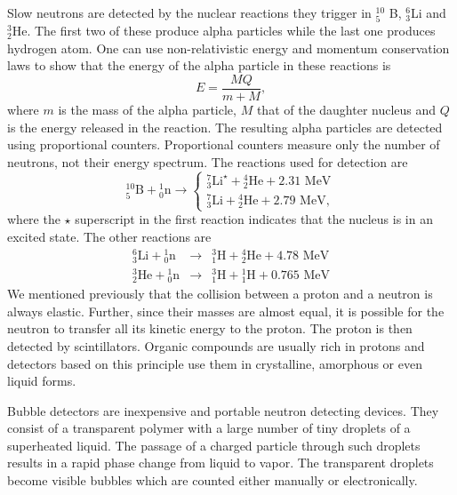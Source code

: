 \documentclass{article}
\numberwithin{equation}{section}
\begin{document}
Slow neutrons are detected by the nuclear reactions they trigger in ${}^{10}_5$
B, ${}^6_3$Li and ${}^3_2$He. The first two of these produce alpha particles
while the last one produces hydrogen atom. One can use non-relativistic energy
and momentum conservation laws to show that the energy of the alpha particle
in these reactions is \cite{turner2008atoms}
\begin{equation}\label{s5e1}
E = \frac{MQ}{m + M},
\end{equation}
where $m$ is the mass of the alpha particle, $M$ that of the daughter 
nucleus and $Q$ is the energy released in the reaction. The resulting alpha
particles are detected using proportional counters. Proportional counters
measure only the number of neutrons, not their energy spectrum. The reactions
used for detection are \cite{crane1991neutron}
\begin{equation}\label{s5e2}
{}^{10}_5\text{B}+{}^1_0\text{n} \rightarrow \begin{cases}
{}^7_3\text{Li}^\star + {}^4_2\text{He} + 2.31\text{ MeV} \\
{}^7_3\text{Li} + {}^4_2\text{He} + 2.79\text{ MeV}, 
\end{cases}
\end{equation}
where the $\star$ superscript in the first reaction indicates that the nucleus
is in an excited state. The other reactions are
\begin{eqnarray}
{}^6_3\text{Li}+{}^1_0\text{n}&\rightarrow&{}^3_1\text{H} + {}^4_2\text{He} +
4.78\text{ MeV} \label{s5e3} \\
{}^3_2\text{He}+{}^1_0\text{n}&\rightarrow&{}^3_1\text{H} + {}^1_1\text{H} +
0.765\text{ MeV} \label{s5e4} 
\end{eqnarray}
We mentioned previously that the collision between a proton and a neutron is
always elastic. Further, since their masses are almost equal, it is possible
for the neutron to transfer all its kinetic energy to the proton. The proton
is then detected by scintillators. Organic compounds are usually rich in 
protons and detectors based on this principle use them in crystalline, 
amorphous or even liquid forms. 

Bubble detectors are inexpensive and portable neutron detecting devices. They
consist of a transparent polymer with a large number of tiny droplets of 
a superheated liquid. The passage of a charged particle through such droplets
results in a rapid phase change from liquid to vapor. The transparent droplets
become visible bubbles which are counted either manually or electronically.
\end{document}
